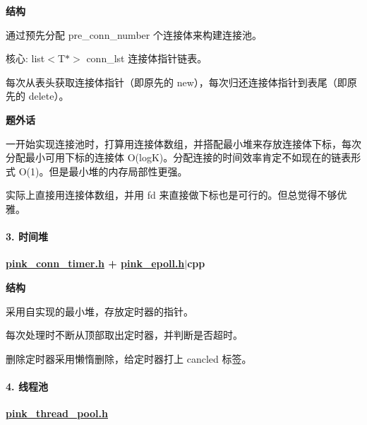 \begin{DoxyItemize}
\item {\bfseries 结构}
\end{DoxyItemize}
\begin{DoxyEnumerate}
\item 通过预先分配 pre\+\_\+conn\+\_\+number 个连接体来构建连接池。
\item 核心\+: list$<$\+T$\ast$$>$ conn\+\_\+lst 连接体指针链表。
\item 每次从表头获取连接体指针（即原先的 new），每次归还连接体指针到表尾（即原先的 delete）。
\end{DoxyEnumerate}
\begin{DoxyItemize}
\item {\bfseries 题外话}
\end{DoxyItemize}
\begin{DoxyEnumerate}
\item 一开始实现连接池时，打算用连接体数组，并搭配最小堆来存放连接体下标，每次分配最小可用下标的连接体 O(log\+K)。分配连接的时间效率肯定不如现在的链表形式 O(1)。但是最小堆的内存局部性更强。
\item 实际上直接用连接体数组，并用 fd 来直接做下标也是可行的。但总觉得不够优雅。
\end{DoxyEnumerate}

\paragraph*{3. 时间堆}

{\bfseries \hyperlink{pink__conn__timer_8h}{pink\+\_\+conn\+\_\+timer.\+h} + \hyperlink{pink__epoll_8h}{pink\+\_\+epoll.\+h}$\vert$cpp}


\begin{DoxyItemize}
\item {\bfseries 结构}
\end{DoxyItemize}
\begin{DoxyEnumerate}
\item 采用自实现的最小堆，存放定时器的指针。
\item 每次处理时不断从顶部取出定时器，并判断是否超时。
\item 删除定时器采用懒惰删除，给定时器打上 cancled 标签。
\end{DoxyEnumerate}

\paragraph*{4. 线程池}

{\bfseries \hyperlink{pink__thread__pool_8h}{pink\+\_\+thread\+\_\+pool.\+h}}


